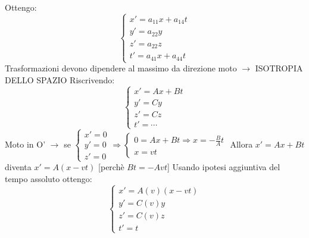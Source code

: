 Ottengo:
\begin{equation*}
    \begin{cases}
        x' = a_{11}x + a_{14}t \\
        y' = a_{22}y \\
        z' = a_{22}z \\
        t' = a_{41}x + a_{44}t
    \end{cases}
\end{equation*}
Trasformazioni devono dipendere al massimo da direzione moto $\rightarrow$ ISOTROPIA DELLO SPAZIO \newline
Riscrivendo:
\begin{equation*}
    \begin{cases}
        x' = Ax + Bt \\
        y' = Cy \\
        z' = Cz \\
        t' = \dotsb 
    \end{cases}
\end{equation*}
Moto in O' $\rightarrow$ se 
$\begin{cases}
    x'=0 \\
    y'=0 \\
    z'=0
\end{cases} 
\Rightarrow 
\begin{cases}
    0 = Ax + Bt  \Rightarrow x = - \frac{B}{A}t\\
    x = vt 
\end{cases}$ 
\newline Allora $x' = Ax +Bt$ diventa $x'=A(x-vt)$ [perchè $Bt = -Avt$] \newline
Usando ipotesi aggiuntiva del tempo assoluto ottengo:
\begin{equation*}
    \begin{cases}
        x' = A(v)(x -vt) \\
        y' = C(v)y \\
        z' = C(v)z \\
        t' = t 
    \end{cases}
\end{equation*}
